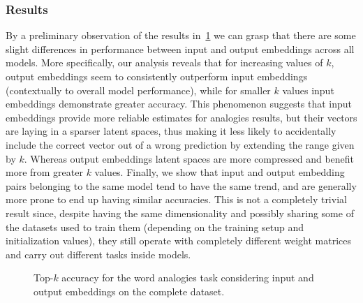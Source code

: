 \subsubsection{Results}

By a preliminary observation of the results in~\cref{fig:exp_emb_2_A} we can grasp that there are some slight differences in performance between input and output embeddings across all models.
More specifically, our analysis reveals that for increasing values of $k$, output embeddings seem to consistently outperform input embeddings (contextually to overall model performance), while for smaller $k$ values input embeddings demonstrate greater accuracy.
This phenomenon suggests that input embeddings provide more reliable estimates for analogies results, but their vectors are laying in a sparser latent spaces, thus making it less likely to accidentally include the correct vector out of a wrong prediction by extending the range given by $k$.
Whereas output embeddings latent spaces are more compressed and benefit more from greater $k$ values.
Finally, we show that input and output embedding pairs belonging to the same model tend to have the same trend, and are generally more prone to end up having similar accuracies.
This is not a completely trivial result since, despite having the same dimensionality and possibly sharing some of the datasets used to train them (depending on the training setup and initialization values), they still operate with completely different weight matrices and carry out different tasks inside models.

\begin{figure}[t!]
    \centering
    \caption{Top-$k$ accuracy for the word analogies task considering input and output embeddings on the complete dataset.}
    \label{fig:exp_emb_2_A}
\end{figure}

